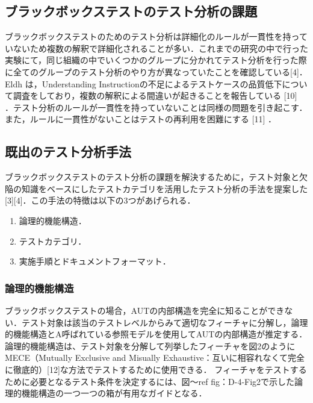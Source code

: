 \documentclass[a4paper,12pt]{jreport}
\begin{document}
\subsection{ブラックボックステストのテスト分析の課題}
ブラックボックステストのためのテスト分析は詳細化のルールが一貫性を持っていないため複数の解釈で詳細化されることが多い．これまでの研究の中で行った実験にて，同じ組織の中でいくつかのグループに分かれてテスト分析を行った際に全てのグループのテスト分析のやり方が異なっていたことを確認している[4]．Eldh は，Understanding Instructionの不足によるテストケースの品質低下について調査をしており，複数の解釈による間違いが起きることを報告している [10] ．テスト分析のルールが一貫性を持っていないことは同様の問題を引き起こす．また，ルールに一貫性がないことはテストの再利用を困難にする [11] ．

\subsection{既出のテスト分析手法}
ブラックボックステストのテスト分析の課題を解決するために，テスト対象と欠陥の知識をベースにしたテストカテゴリを活用したテスト分析の手法を提案した[3][4]．この手法の特徴は以下の3つがあげられる．

\begin{enumerate}
\item 論理的機能構造．
\item テストカテゴリ．
\item 実施手順とドキュメントフォーマット．
\end{enumerate}

\subsubsection{論理的機能構造}

ブラックボックステストの場合，AUTの内部構造を完全に知ることができない．テスト対象は該当のテストレベルからみて適切なフィーチャに分解し，論理的機能構造とA呼ばれている参照モデルを使用してAUTの内部構造が推定する． 論理的機能構造は、テスト対象を分解して列挙したフィーチャを図2のようにMECE（Mutually Exclusive and Misually Exhaustive：互いに相容れなくて完全に徹底的）[12]な方法でテストするために使用できる． フィーチャをテストするために必要となるテスト条件を決定するには、図〜ref {fig：D-4-Fig2}で示した論理的機能構造の一つ一つの箱が有用なガイドとなる．
\end{document}
